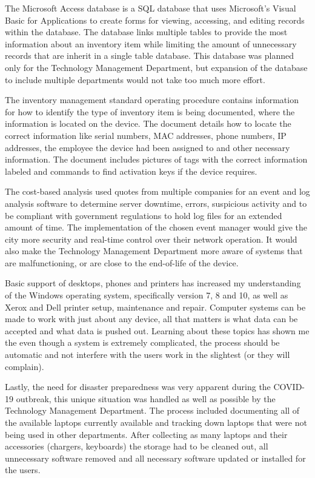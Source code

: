 \documentclass[12pt]{article}
\begin{document}
	The Microsoft Access database is a SQL database that uses Microsoft's Visual Basic
	for Applications to create forms for viewing, accessing, and editing records within
	the database. The database links multiple tables to provide the most information
	about an inventory item while limiting the amount of unnecessary records that are
	inherit in a single table database. This database was planned only for the Technology
	Management Department, but expansion of the database to include multiple departments
	would not take too much more effort.

	The inventory management standard operating procedure contains information for how to
	identify the type of inventory item is being documented, where the information is
	located on the device. The document details how to locate the correct information
	like serial numbers, MAC addresses, phone numbers, IP addresses, the employee
	the device had been assigned to and other necessary information. The document
	includes pictures of tags with the correct information labeled and commands to
	find activation keys if the device requires.

	The cost-based analysis used quotes from multiple companies for an
	event and log analysis software to determine server downtime, errors, suspicious
	activity and to be compliant with government regulations to hold log files for an
	extended amount of time. The implementation of the chosen event manager would give
	the city more security and real-time control over their network operation. It would
	also make the Technology Management Department more aware of systems that are
	malfunctioning, or are close to the end-of-life of the device.

	Basic support of desktops, phones and printers has increased my understanding of the
	Windows operating system, specifically version 7, 8 and 10, as well as Xerox and Dell
	printer setup, maintenance and repair. Computer systems can be made to work with
	just about any device, all that matters is what data can be accepted and what data
	is pushed out. Learning about these topics has shown me the even though a system is
	extremely complicated, the process should be automatic and not interfere with the
	users work in the slightest (or they will complain).

	Lastly, the need for disaster preparedness was very apparent during the COVID-19
	outbreak, this unique situation was handled as well as possible by the Technology 
	Management Department. The process included documenting all of the available laptops
	currently available and tracking down laptops that were not being used in other
	departments. After collecting as many laptops and their accessories (chargers, keyboards)
	the storage had to be cleaned out, all unnecessary software removed and all necessary
	software updated or installed for the users.
\end{document}
